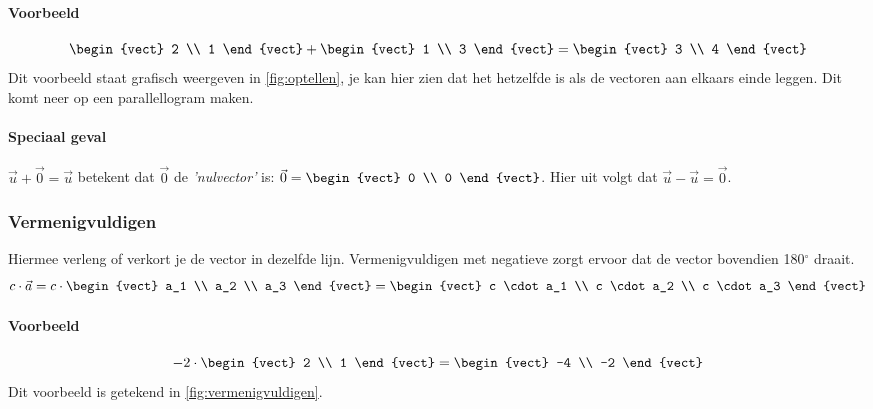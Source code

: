 \paragraph{Voorbeeld}
\[ \begin{vect} 2 \\ 1 \end{vect}
	+ \begin{vect} 1 \\ 3 \end{vect}
	= \begin{vect} 3 \\ 4 \end{vect} \]
Dit voorbeeld staat grafisch weergeven in \autoref{fig:optellen}, je kan hier zien dat het hetzelfde is als de vectoren aan elkaars einde leggen. Dit komt neer op een parallellogram maken.


\paragraph{Speciaal geval}
$\vec{u} + \vec{0} = \vec{u}$ betekent dat $\vec{0}$ de \emph{'nulvector'}  is: $\vec{0} = \begin{vect} 0 \\ 0 \end{vect}$. Hier uit volgt dat $\vec{u} - \vec{u} = \vec{0}$.

\subsubsection{Vermenigvuldigen}
Hiermee verleng of verkort je de vector in dezelfde lijn. Vermenigvuldigen met negatieve zorgt ervoor dat de vector bovendien 180$^\circ$ draait.
\[ c \cdot \vec{a} = c \cdot \begin{vect} a_1 \\ a_2 \\ a_3 \end{vect}
	= \begin{vect}
	c \cdot a_1 \\
	c \cdot a_2 \\
	c \cdot a_3
	\end{vect} \]

\paragraph{Voorbeeld}

\[ -2 \cdot \begin{vect} 2 \\ 1 \end{vect} = \begin{vect} -4 \\ -2 \end{vect} \]
Dit voorbeeld is getekend in \autoref{fig:vermenigvuldigen}.

